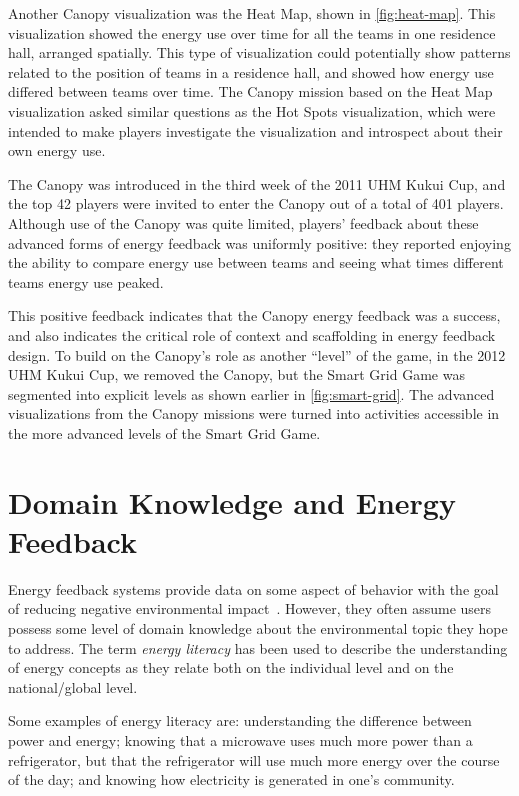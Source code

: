 \documentclass[10pt, conference, compsocconf]{IEEEtran-old}
\begin{document}
Another Canopy visualization was the Heat Map, shown in \autoref{fig:heat-map}. This visualization showed the energy use over time for all the teams in one residence hall, arranged spatially. This type of visualization could potentially show patterns related to the position of teams in a residence hall, and showed how energy use differed between teams over time. The Canopy mission based on the Heat Map visualization asked similar questions as the Hot Spots visualization, which were intended to make players investigate the visualization and introspect about their own energy use.

The Canopy was introduced in the third week of the 2011 UHM Kukui Cup, and the top 42 players were invited to enter the Canopy out of a total of 401 players. Although use of the Canopy was quite limited, players' feedback about these advanced forms of energy feedback was uniformly positive: they reported enjoying the ability to compare energy use between teams and seeing what times different teams energy use peaked. 

This positive feedback indicates that the Canopy energy feedback was a success, and also indicates the critical role of context and scaffolding in energy feedback design. To build on the Canopy's role as another ``level'' of the game, in the 2012 UHM Kukui Cup, we removed the Canopy, but the Smart Grid Game was segmented into explicit levels as shown earlier in \autoref{fig:smart-grid}. The advanced visualizations from the Canopy missions were turned into activities accessible in the more advanced levels of the Smart Grid Game.


\section{Domain Knowledge and Energy Feedback}

Energy feedback systems provide data on some aspect of behavior with the goal of reducing negative environmental impact~\cite{Froehlich2010}. However, they often assume users possess some level of domain knowledge about the environmental topic they hope to address. The term \emph{energy literacy} has been used to describe the understanding of energy concepts as they relate both on the individual level and on the national/global level.

Some examples of energy literacy are: understanding the difference between power and energy; knowing that a microwave uses much more power than a refrigerator, but that the refrigerator will use much more energy over the course of the day; and knowing how electricity is generated in one's community.
\end{document}
